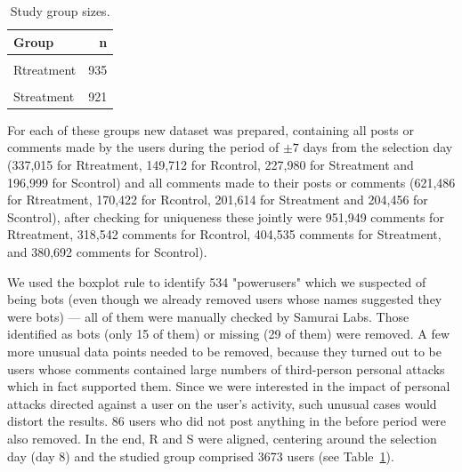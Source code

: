 \documentclass[a4paper,fleqn]{cas-dc}
\begin{document}
\begin{table}[H]

\centering\begingroup\fontsize{9}{11}\selectfont

\begin{tabular}{lr}
\toprule
Group & n\\
\midrule
\cellcolor{gray!6}{Rcontrol} & \cellcolor{gray!6}{875}\\
Rtreatment & 935\\
\cellcolor{gray!6}{Scontrol} & \cellcolor{gray!6}{942}\\
Streatment & 921\\
\bottomrule
\end{tabular}
\endgroup{}
\caption{Study group sizes.}
\label{tab:groups}
\end{table}






For each of these groups new  dataset was prepared, containing all posts or comments made by the users during the period of $\pm 7$ days from the selection day (337,015 for \textsf{Rtreatment}, 149,712 for \textsf{Rcontrol}, 227,980 for \textsf{Streatment} and 196,999 for \textsf{Scontrol}) and all comments made to their posts or comments (621,486 for \textsf{Rtreatment}, 170,422 for \textsf{Rcontrol}, 201,614 for \textsf{Streatment} and 204,456 for \textsf{Scontrol}), after checking for uniqueness these jointly were 951,949 comments for \textsf{Rtreatment}, 318,542 comments for \textsf{Rcontrol}, 404,535 comments for \textsf{Streatment}, and 380,692 comments for \textsf{Scontrol}).  







We used the boxplot rule to identify   534 "powerusers" which we suspected of being bots (even though we already removed users whose names suggested they were bots) --- all of them were manually checked by \textsf{Samurai Labs}. Those identified as bots (only 15 of them) or missing (29 of them) were removed.  A few more unusual data points needed to be removed, because they turned out to be users whose comments contained large numbers of third-person personal attacks which in fact supported them. Since we were interested in the impact of personal attacks directed against a user on the user's activity, such unusual cases would distort the results.   86 users who did not post anything in the \textsf{before} period were also removed.  In the end, \textsf{R} and \textsf{S} were aligned, centering around the selection day (day 8) and the studied group comprised 3673 users (see 
\mbox{Table \ref{tab:groups}}).
\end{document}
